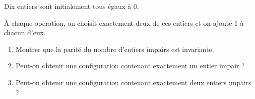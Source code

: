 Dix entiers sont initialement tous égaux à $0$.

À chaque opération, on choisit exactement deux de ces entiers et on ajoute
$1$ à chacun d'eux.
\begin{enumerate}
  \item Montrer que la parité du nombre d'entiers impairs est invariante.
  \item Peut-on obtenir une configuration contenant exactement un entier
  impair ?
  \item Peut-on obtenir une configuration contenant exactement deux entiers
  impairs ?
\end{enumerate}
